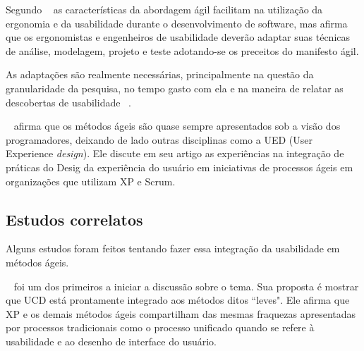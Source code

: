 	Segundo ~ as características da abordagem ágil facilitam na utilização da ergonomia e da usabilidade durante o desenvolvimento de software, mas afirma que os ergonomistas e engenheiros de usabilidade deverão adaptar suas técnicas de análise, modelagem, projeto e teste adotando-se os preceitos do manifesto ágil.
	
	As adaptações são realmente necessárias, principalmente na questão da granularidade da pesquisa, no tempo gasto com ela e na maneira de relatar as descobertas de usabilidade ~\cite{santos2012}.


	~ afirma que os métodos ágeis são quase sempre apresentados sob a visão dos programadores, deixando de lado outras disciplinas como a UED (User Experience \emph{design}). Ele discute em seu artigo as experiências na integração de práticas do Desig da experiência do usuário em iniciativas de processos ágeis em organizações que utilizam XP e Scrum. %

\subsection{Estudos correlatos}

Alguns estudos foram feitos tentando fazer essa integração da usabilidade em métodos ágeis. 

~ foi um dos primeiros a iniciar a discussão sobre o tema. Sua proposta é mostrar que UCD está prontamente integrado aos métodos ditos ``leves". Ele afirma que XP e os demais métodos ágeis compartilham das mesmas fraquezas apresentadas por processos tradicionais como o processo unificado quando se refere à usabilidade e ao desenho de interface do usuário.


